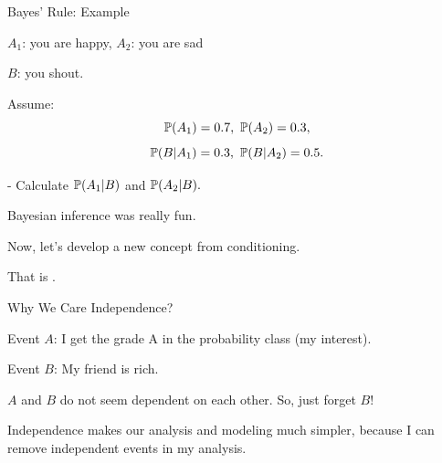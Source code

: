 \documentclass[fleqn,aspectratio=169]{beamer}
\begin{document}
\begin{frame}{Bayes' Rule: Example}

{
\plitemsep 0.1in
\bci 

\item $A_1$: you are happy, $A_2$: you are sad
\item $B$: you shout. 

\item Assume: 
$$
\cprob{A_1}=0.7, \ \cprob{A_2}=0.3,
$$
$$
\mathbb{P}( B | A_1 ) = 0.3, \ \mathbb{P}( B | A_2 )=0.5.
$$

\eci 
}
{
\medskip

- Calculate $\mathbb{P}( A_1 | B )$ and $\mathbb{P}( A_2 | B ).$


}

 

\end{frame}

\begin{frame}{}
\vspace{2cm}
\LARGE Bayesian inference was really fun. 

\medskip

Now, let's develop a new concept from conditioning. 

\medskip

\LARGE That is . 

\end{frame}

\begin{frame}{Why We Care Independence?}

\plitemsep 0.1in
\bci 

\item<2-> Event $A$: I get the grade A in the probability class (my interest).
\item<2-> Event $B$: My friend is rich. 

\bigskip
\item<3-> $A$ and $B$ do not seem dependent on each other. So, just forget $B$!

\item<4-> Independence makes our analysis and modeling much simpler, because I can remove independent events in my analysis.  
\eci 
\end{frame}
\end{document}
